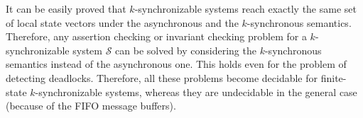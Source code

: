It can be easily proved that $k$-synchronizable systems reach exactly the same set of local state vectors under the asynchronous and the $k$-synchronous semantics. Therefore, any assertion checking or invariant checking problem for a $k$-synchronizable system $\mathcal{S}$ can be solved by considering the $k$-synchronous semantics instead of the asynchronous one. This holds even for the problem of detecting deadlocks. Therefore, all these problems become decidable for finite-state $k$-synchronizable systems, whereas they are undecidable in the general case (because of the FIFO message buffers).
%

\vspace{-1mm}
